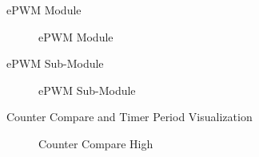 
\begin{frame}{ePWM Module}
	\begin{figure}
		\centering


		\caption{ePWM Module}
	\end{figure}
\end{frame}



\begin{frame}{ePWM Sub-Module}
	\begin{figure}
		\centering
		\caption{ePWM Sub-Module}
	\end{figure}
\end{frame}



\begin{frame}{Counter Compare and Timer Period Visualization}
	\begin{figure}
		\centering
		\caption{Counter Compare High}
	\end{figure}
\end{frame}

